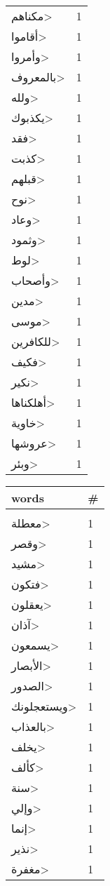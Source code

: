 \documentclass{article}
\begin{document}
\begin{multicols}{6}
\begin{center}
\begin{tabular}{ P{2cm}  P{1cm}}
\<مكناهم> & 1 \\ 
\<أقاموا> & 1 \\ 
\<وأمروا> & 1 \\ 
\<بالمعروف> & 1 \\ 
\<ولله> & 1 \\ 
\<يكذبوك> & 1 \\ 
\<فقد> & 1 \\ 
\<كذبت> & 1 \\ 
\<قبلهم> & 1 \\ 
\<نوح> & 1 \\ 
\<وعاد> & 1 \\ 
\<وثمود> & 1 \\ 
\<لوط> & 1 \\ 
\<وأصحاب> & 1 \\ 
\<مدين> & 1 \\ 
\<موسى> & 1 \\ 
\<للكافرين> & 1 \\ 
\<فكيف> & 1 \\ 
\<نكير> & 1 \\ 
\<أهلكناها> & 1 \\ 
\<خاوية> & 1 \\ 
\<عروشها> & 1 \\ 
\<وبئر> & 1 \\ 
\end{tabular} 
\begin{tabular}{ P{2cm}  P{1cm}} 
\textbf{words}    & \textbf{\#}  \\
\hline
\\[0.01cm]
\<معطلة> & 1 \\ 
\<وقصر> & 1 \\ 
\<مشيد> & 1 \\ 
\<فتكون> & 1 \\ 
\<يعقلون> & 1 \\ 
\<آذان> & 1 \\ 
\<يسمعون> & 1 \\ 
\<الأبصار> & 1 \\ 
\<الصدور> & 1 \\ 
\<ويستعجلونك> & 1 \\ 
\<بالعذاب> & 1 \\ 
\<يخلف> & 1 \\ 
\<كألف> & 1 \\ 
\<سنة> & 1 \\ 
\<وإلي> & 1 \\ 
\<إنما> & 1 \\ 
\<نذير> & 1 \\ 
\<مغفرة> & 1 \\ 

\end{tabular}
\end{center}
\end{multicols}
\end{document}
